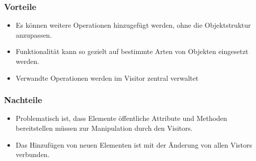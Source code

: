 \subsubsection{Vorteile}
\begin{itemize}
\item Es können weitere Operationen hinzugefügt werden, ohne die Objektstruktur anzupassen.
\item Funktionalität kann so gezielt auf bestimmte Arten von Objekten eingesetzt werden.
\item Verwandte Operationen werden im Visitor zentral verwaltet
\end{itemize}
\subsubsection{Nachteile}
\begin{itemize}

\item Problematisch ist, dass Elemente öffentliche Attribute und Methoden bereitstellen müssen zur Manipulation durch den Visitors. 
\item Das Hinzufügen von neuen Elementen ist mit der Änderung von allen Vistors verbunden.
\end{itemize}